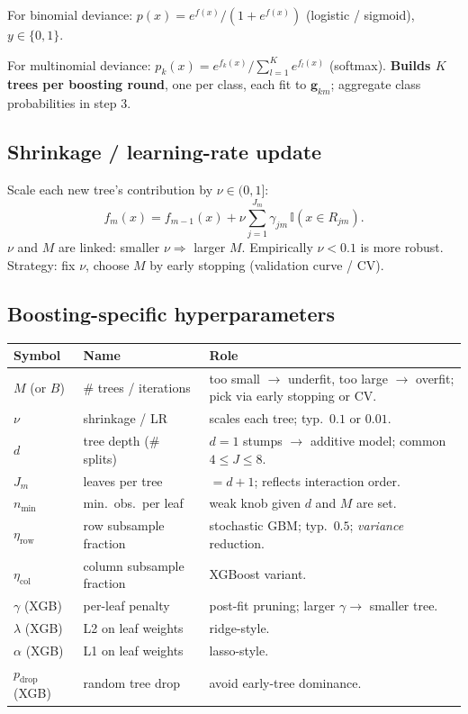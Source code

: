 For binomial deviance: $p(x) = e^{f(x)}/(1+e^{f(x)})$ (logistic / sigmoid), $y\in\{0,1\}$.

For multinomial deviance: $p_k(x) = e^{f_k(x)} / \sum_{l=1}^K e^{f_l(x)}$ (softmax). \textbf{Builds $K$ trees per boosting round}, one per class, each fit to $\mathbf{g}_{km}$; aggregate class probabilities in step 3.

\subsection{Shrinkage / learning-rate update}
Scale each new tree's contribution by $\nu \in (0,1]$:
\[ f_m(x) = f_{m-1}(x) + \nu \sum_{j=1}^{J_m} \gamma_{jm}\, \mathbb{I}(x\in R_{jm}). \]
$\nu$ and $M$ are linked: smaller $\nu \Rightarrow$ larger $M$. Empirically $\nu < 0.1$ is more robust. Strategy: fix $\nu$, choose $M$ by early stopping (validation curve / CV).

\subsection{Boosting-specific hyperparameters}
\scriptsize
\begin{tabularx}{\linewidth}{@{}l l X@{}}
\toprule
Symbol & Name & Role \\
\midrule
$M$ (or $B$)         & \# trees / iterations  & too small $\to$ underfit, too large $\to$ overfit; pick via early stopping or CV. \\
$\nu$                & shrinkage / LR         & scales each tree; typ.\ $0.1$ or $0.01$. \\
$d$                  & tree depth (\# splits) & $d{=}1$ stumps $\to$ additive model; common $4\le J\le 8$. \\
$J_m$                & leaves per tree        & $=d+1$; reflects interaction order. \\
$n_{\min}$           & min.\ obs.\ per leaf   & weak knob given $d$ and $M$ are set. \\
$\eta_{\text{row}}$  & row subsample fraction & stochastic GBM; typ.\ $0.5$; \emph{variance} reduction. \\
$\eta_{\text{col}}$  & column subsample fraction & XGBoost variant. \\
$\gamma$ (XGB)       & per-leaf penalty       & post-fit pruning; larger $\gamma\to$ smaller tree. \\
$\lambda$ (XGB)      & L2 on leaf weights     & ridge-style. \\
$\alpha$ (XGB)       & L1 on leaf weights     & lasso-style. \\
$p_{\text{drop}}$ (XGB) & random tree drop    & avoid early-tree dominance. \\
\bottomrule
\end{tabularx}
\normalsize

